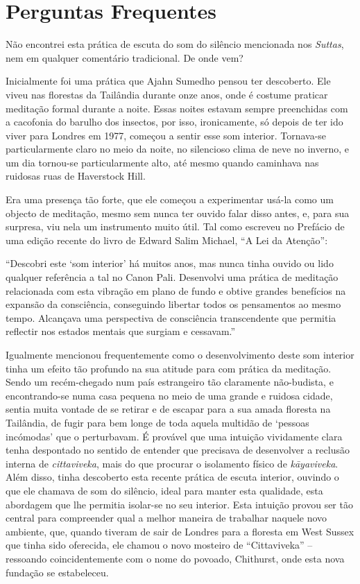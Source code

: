 \chapter{Perguntas Frequentes}

 Não encontrei esta prática de escuta do som do silêncio mencionada
nos \emph{Suttas}, nem em qualquer comentário tradicional. De onde vem?

\smallskip
\noindent
{} Inicialmente foi uma prática que Ajahn Sumedho pensou ter descoberto.
Ele viveu nas florestas da Tailândia durante onze anos, onde é costume
praticar meditação formal durante a noite. Essas noites estavam sempre
preenchidas com a cacofonia do barulho dos insectos, por isso,
ironicamente, só depois de ter ido viver para Londres em 1977, começou a
sentir esse som interior. Tornava-se particularmente claro no meio da
noite, no silencioso clima de neve no inverno, e um dia tornou-se
particularmente alto, até mesmo quando caminhava nas ruidosas ruas de
Haverstock Hill.

Era uma presença tão forte, que ele começou a experimentar usá-la como um
objecto de meditação, mesmo sem nunca ter ouvido falar disso antes, e, para sua
surpresa, viu nela um instrumento muito útil. Tal como escreveu no Prefácio de
uma edição recente do livro de Edward Salim Michael, ``A Lei da
Atenção'':

``Descobri este `som interior' há muitos anos, mas nunca tinha ouvido ou
lido qualquer referência a tal no Canon Pali. Desenvolvi uma prática de
meditação relacionada com esta vibração em plano de fundo e obtive
grandes benefícios na expansão da consciência, conseguindo libertar
todos os pensamentos ao mesmo tempo. Alcançava uma perspectiva de
consciência transcendente que permitia reflectir nos estados mentais que
surgiam e cessavam.''

Igualmente mencionou frequentemente como o desenvolvimento deste som
interior tinha um efeito tão profundo na sua atitude para com prática da
meditação. Sendo um recém-chegado num país estrangeiro tão claramente
não-budista, e encontrando-se numa casa pequena no meio de uma grande e
ruidosa cidade, sentia muita vontade de se retirar e de escapar para a
sua amada floresta na Tailândia, de fugir para bem longe de toda aquela
multidão de `pessoas incómodas' que o perturbavam. É provável que uma
intuição vividamente clara tenha despontado no sentido de entender que
precisava de desenvolver a reclusão interna de \emph{cittaviveka}, mais
do que procurar o isolamento físico de \emph{kāyaviveka}. Além disso,
tinha descoberto esta recente prática de escuta interior, ouvindo o que
ele chamava de som do silêncio, ideal para manter esta qualidade, esta
abordagem que lhe permitia isolar-se no seu interior. Esta intuição
provou ser tão central para compreender qual a melhor maneira de
trabalhar naquele novo ambiente, que, quando tiveram de sair de Londres
para a floresta em West Sussex que tinha sido oferecida, ele chamou o
novo mosteiro de ``Cittaviveka'' -- ressoando coincidentemente com o
nome do povoado, Chithurst, onde esta nova fundação se estabeleceu.

